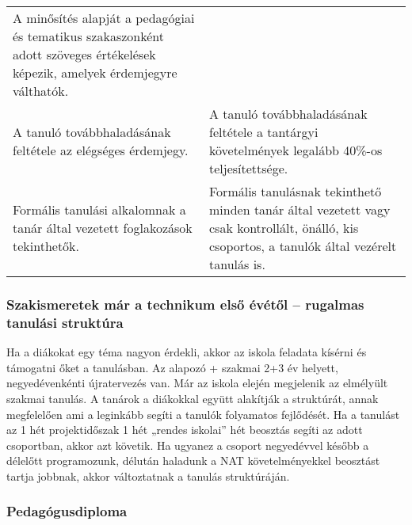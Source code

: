 \begin{longtable}[]{@{}ll@{}}
\begin{minipage}[t]{0.61\columnwidth}
A minősítés alapját a pedagógiai és tematikus szakaszonként adott
szöveges értékelések képezik, amelyek érdemjegyre válthatók.\strut
\end{minipage}\tabularnewline
\begin{minipage}[t]{0.33\columnwidth}\raggedright
A tanuló továbbhaladásának feltétele az elégséges érdemjegy.\strut
\end{minipage} & \begin{minipage}[t]{0.61\columnwidth}\raggedright
A tanuló továbbhaladásának feltétele a tantárgyi követelmények legalább
40\%-os teljesítettsége.\strut
\end{minipage}\tabularnewline
\begin{minipage}[t]{0.33\columnwidth}\raggedright
Formális tanulási alkalomnak a tanár által vezetett foglakozások
tekinthetők.\strut
\end{minipage} & \begin{minipage}[t]{0.61\columnwidth}\raggedright
Formális tanulásnak tekinthető minden tanár által vezetett vagy csak
kontrollált, önálló, kis csoportos, a tanulók által vezérelt tanulás
is.\strut
\end{minipage}\tabularnewline
\bottomrule
\end{longtable}

\hypertarget{szakismeretek-mar-a-technikum-elso-evetol-rugalmas-tanulasi-struktura}{%
\subsubsection{Szakismeretek már a technikum első évétől -- rugalmas
tanulási
struktúra}\label{szakismeretek-mar-a-technikum-elso-evetol-rugalmas-tanulasi-struktura}}

Ha a diákokat egy téma nagyon érdekli, akkor az iskola feladata kísérni
és támogatni őket a tanulásban. Az alapozó + szakmai 2+3 év helyett,
negyedévenkénti újratervezés van. Már az iskola elején megjelenik az
elmélyült szakmai tanulás. A tanárok a diákokkal együtt alakítják a
struktúrát, annak megfelelően ami a leginkább segíti a tanulók
folyamatos fejlődését. Ha a tanulást az 1 hét projektidőszak 1 hét
„rendes iskolai'' hét beosztás segíti az adott csoportban, akkor azt
követik. Ha ugyanez a csoport negyedévvel később a délelőtt
programozunk, délután haladunk a NAT követelményekkel beosztást tartja
jobbnak, akkor változtatnak a tanulás struktúráján.

\hypertarget{pedagogusdiploma}{%
\subsubsection{Pedagógusdiploma}\label{pedagogusdiploma}}

